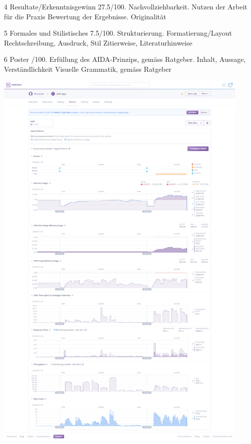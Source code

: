 \documentclass{ffhsthesis}
\begin{document}
4 Resultate/Erkenntnisgewinn 27.5/100. Nachvollziehbarkeit. Nutzen der Arbeit für die Praxis Bewertung der Ergebnisse. Originalität\newline

5 Formales und Stilistisches 7.5/100. Strukturierung. Formatierung/Layout Rechtschreibung, Ausdruck, Stil Zitierweise, Literaturhinweise\newline

6 Poster /100. Erfüllung des AIDA-Prinzips, gemäss Ratgeber. Inhalt, Aussage, Verständlichkeit Visuelle Grammatik, gemäss Ratgeber\newline
\fi


\includegraphics[width=350pt ]{anhang/screencapture-dashboard-heroku-apps-dinf-app-metrics-web-1517153971214.png}\newline
\end{document}

